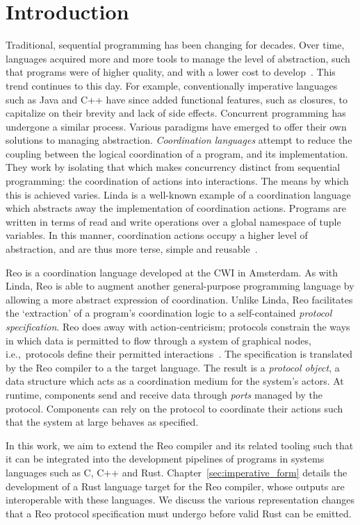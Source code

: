 \chapter{Introduction}	


Traditional, sequential programming has been changing for decades. Over time, languages acquired more and more tools to manage the level of abstraction, such that programs were of higher quality, and with a lower cost to develop~\cite{shaw1984abstraction}. This trend continues to this day. For example, conventionally imperative languages such as Java and C++ have since added functional features, such as closures, to capitalize on their brevity and lack of side effects. Concurrent programming has undergone a similar process. Various paradigms have emerged to offer their own solutions to managing abstraction. \textit{Coordination languages} attempt to reduce the coupling between the logical coordination of a program, and its implementation. They work by isolating that which makes concurrency distinct from sequential programming: the coordination of actions into interactions. The means by which this is achieved varies. Linda is a well-known example of a coordination language which abstracts away the implementation of coordination actions. Programs are written in terms of read and write operations over a global namespace of tuple variables. In this manner, coordination actions occupy a higher level of abstraction, and are thus more terse, simple and reusable~\cite{gelernter1985generative}.


Reo is a coordination language developed at the CWI in Amsterdam. As with Linda, Reo is able to augment another general-purpose programming language by allowing a more abstract expression of coordination. Unlike Linda, Reo facilitates the `extraction' of a program's coordination logic to a self-contained \textit{protocol specification}. Reo does away with action-centricism; protocols constrain the ways in which data is permitted to flow through a system of graphical nodes, i.e.,\ protocols define their permitted interactions~\cite{arbab2005abstract}. The specification is translated by the Reo compiler to a the target language. The result is a \textit{protocol object}, a data structure which acts as a coordination medium for the system's actors. At runtime, components send and receive data through \textit{ports} managed by the protocol. Components can rely on the protocol to coordinate their actions such that the system at large behaves as specified. 

In this work, we aim to extend the Reo compiler and its related tooling such that it can be integrated into the development pipelines of programs in systems languages such as C, C++ and Rust. Chapter~\ref{sec:imperative_form} details the development of a Rust language target for the Reo compiler, whose outputs are interoperable with these languages. We discuss the various representation changes that a Reo protocol specification must undergo before valid Rust can be emitted.

